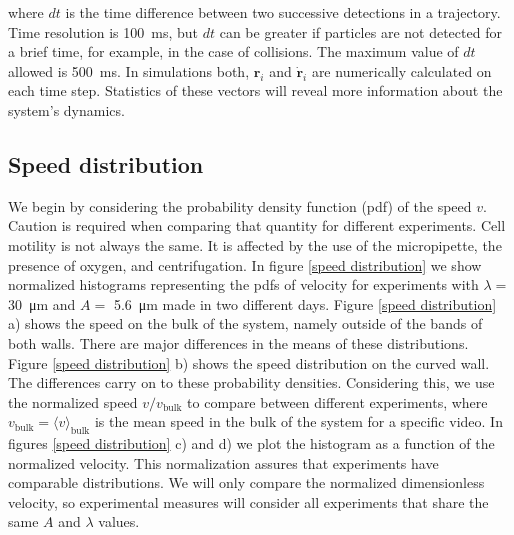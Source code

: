 where $dt$ is the time difference between two successive detections in a trajectory. Time resolution is \SI{100}{\milli\second}, but $dt$ can be greater if particles are not detected for a brief time, for example, in the case of collisions. The maximum value of $dt$ allowed is \SI{500}{\milli\second}. In simulations both, $\textbf{r}_i$ and $\dot{\textbf{r}}_i$ are numerically calculated on each time step. Statistics of these vectors will reveal more information about the system's dynamics.


\subsection{Speed distribution}

We begin by considering the probability density function (pdf) of the speed $v$. Caution is required when comparing that quantity for different experiments. Cell motility is not always the same. It is affected by the use of the micropipette, the presence of oxygen, and centrifugation. In figure \ref{speed distribution} we show normalized histograms representing the pdfs of velocity for experiments with $\lambda=$ \SI{30}{\micro\meter} and $A=$ \SI{5.6}{\micro\meter} made in two different days. Figure \ref{speed distribution} a) shows the speed on the bulk of the system, namely outside of the bands of both walls. There are major differences in the means of these distributions. Figure \ref{speed distribution} b) shows the speed distribution on the curved wall. The differences carry on to these probability densities. Considering this, we use the normalized speed $v/v_{\text{bulk}}$ to compare between different experiments, where $v_{\text{bulk}} = \langle v \rangle_{\text{bulk}} $ is the mean speed in the bulk of the system for a specific video. In figures \ref{speed distribution} c) and d) we plot the histogram as a function of the normalized velocity. This normalization assures that experiments have comparable distributions. We will only compare the normalized dimensionless velocity, so experimental measures will consider all experiments that share the same $A$ and $\lambda$ values.

